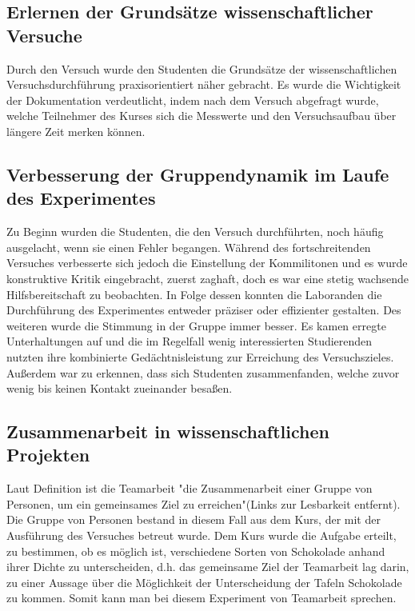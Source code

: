 \documentclass[12pt]{scrartcl}
\begin{document}
\subsection{Erlernen der Grundsätze wissenschaftlicher Versuche}
Durch den Versuch wurde den Studenten die Grundsätze der wissenschaftlichen Versuchsdurchführung praxisorientiert näher gebracht. Es wurde die Wichtigkeit der Dokumentation verdeutlicht, indem nach dem Versuch abgefragt wurde, welche Teilnehmer des Kurses sich die Messwerte und den Versuchsaufbau über längere Zeit merken können.
\subsection{Verbesserung der Gruppendynamik im Laufe des Experimentes}
Zu Beginn wurden die Studenten, die den Versuch durchführten, noch häufig ausgelacht, wenn sie einen Fehler begangen. Während des fortschreitenden Versuches verbesserte sich jedoch die Einstellung der Kommilitonen und es wurde konstruktive Kritik eingebracht, zuerst zaghaft, doch es war eine stetig wachsende Hilfsbereitschaft zu beobachten. In Folge dessen konnten die Laboranden die Durchführung des Experimentes entweder präziser oder effizienter gestalten. Des weiteren wurde die Stimmung in der Gruppe immer besser. Es kamen erregte Unterhaltungen auf und die im Regelfall wenig interessierten Studierenden nutzten ihre kombinierte Gedächtnisleistung zur Erreichung des Versuchszieles. Außerdem war zu erkennen, dass sich Studenten zusammenfanden, welche zuvor wenig bis keinen Kontakt zueinander besaßen.
\subsection{Zusammenarbeit in wissenschaftlichen Projekten}
Laut Definition ist die Teamarbeit "die Zusammenarbeit einer Gruppe von Personen, um ein gemeinsames Ziel zu erreichen"(Links zur Lesbarkeit entfernt). Die Gruppe von Personen bestand in diesem Fall aus dem Kurs, der mit der Ausführung des Versuches betreut wurde. Dem Kurs wurde die Aufgabe erteilt, zu bestimmen, ob es möglich ist, verschiedene Sorten von Schokolade anhand ihrer Dichte zu unterscheiden, d.h. das gemeinsame Ziel der Teamarbeit lag darin, zu einer Aussage über die Möglichkeit der Unterscheidung der Tafeln Schokolade zu kommen. Somit kann man bei diesem Experiment von Teamarbeit sprechen.
\end{document}
